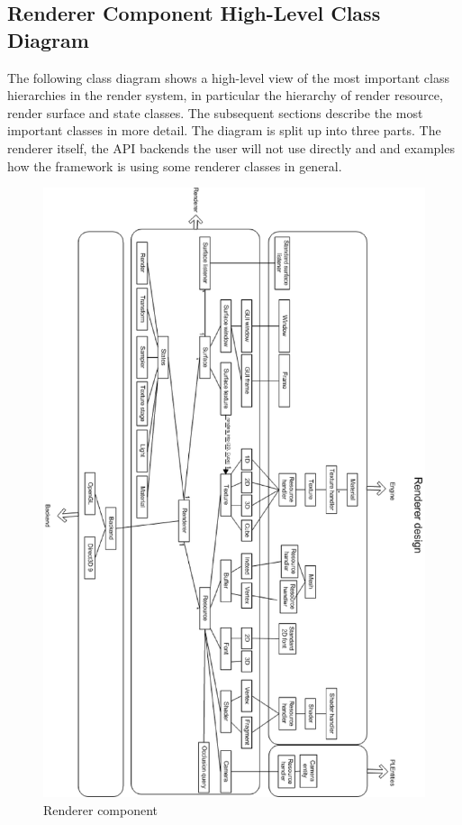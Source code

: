 \subsection{Renderer Component High-Level Class Diagram}
The following class diagram shows a high-level view of the most important class hierarchies in the render system, in particular the hierarchy of render resource, render surface and state classes. The subsequent sections describe the most important classes in more detail. The diagram is split up into three parts. The renderer itself, the API backends the user will not use directly and and examples how the framework is using some renderer classes in general.

\begin{figure}
  \centering
  \includegraphics[scale=0.7]{pics/PLRendererClassDiagram.eps}
  \caption{Renderer component}
  \label{fig:Renderer component high-level class diagram}
\end{figure}




